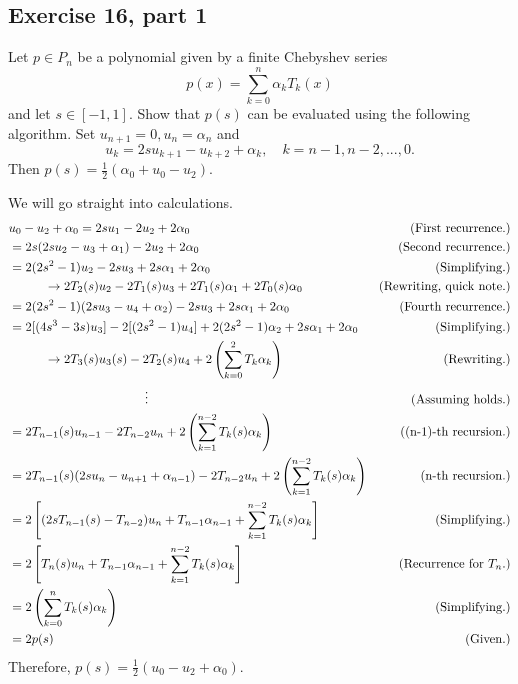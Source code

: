\subsection{Exercise 16, part 1}
Let $p \in P_n$ be a polynomial given by a finite Chebyshev series
\[p(x) = \sum_{k = 0}^n \alpha_k T_k(x)\]
and let $s \in [-1, 1]$. Show that $p(s)$ can be evaluated using the following algorithm. Set $u_{n+1} = 0, u_n = \alpha_n$ and 
\[u_k = 2su_{k+1} - u_{k+2} + \alpha_k, \quad k = n - 1, n - 2, ..., 0.\]
Then $p(s) = \frac{1}{2}(\alpha_0 + u_0 - u_2).$
\partbreak
\begin{solution}

    We will go straight into calculations. 
    \tightalignbreak
\begin{align*}
    &u_0 - u_2 + \alpha_0 = 2su_1 - 2u_2 + 2\alpha_0 &\text{(First recurrence.)}\\
    &= 2s(2su_2 - u_3 + \alpha_1) - 2u_2 + 2\alpha_0 &\text{(Second recurrence.)}\\
    &= 2(2s^2 - 1)u_2 - 2su_3 + 2s\alpha_1 + 2\alpha_0 &\text{(Simplifying.)}\\
    &\hspace{10mm}\rightarrow 2T_2(s)u_2 - 2T_1(s)u_3 + 2T_1(s)\alpha_1 + 2T_0(s)\alpha_0 &\text{(Rewriting, quick note.)}\\
    &= 2(2s^2 - 1)(2su_3 - u_4 + \alpha_2) - 2su_3 + 2s\alpha_1 + 2\alpha_0&\text{(Fourth recurrence.)}\\
    &= 2[(4s^3 - 3s)u_3] - 2[(2s^2 - 1)u_4] + 2(2s^2 - 1)\alpha_2 + 2s\alpha_1 + 2\alpha_0 &\text{(Simplifying.)}\\
    &\hspace{10mm}\rightarrow 2T_3(s)u_3(s) - 2T_2(s)u_4 + 2\left(\sum_{k = 0}^2 T_k\alpha_k\right) &\text{(Rewriting.)}\\
    &\hspace{1.5in}\vdots &\text{(Assuming holds.)}\\
    &= 2T_{n-1}(s)u_{n-1} - 2T_{n-2}u_n + 2\left(\sum_{k = 1}^{n-2}T_k(s)\alpha_k\right) &\text{((n-1)-th recursion.)}\\
    &= 2T_{n-1}(s)(2su_n - u_{n+1} + \alpha_{n-1}) - 2T_{n-2}u_n + 2\left(\sum_{k = 1}^{n-2}T_k(s)\alpha_k\right) &\text{(n-th recursion.)}\\
    &= 2\left[ (2sT_{n-1}(s) - T_{n-2})u_n + T_{n-1}\alpha_{n-1} + \sum_{k = 1}^{n-2}T_k(s)\alpha_k\right] &\text{(Simplifying.)}\\
    &= 2\left[T_n(s)u_n + T_{n-1}\alpha_{n-1} + \sum_{k = 1}^{n-2}T_k(s)\alpha_k\right] &\text{(Recurrence for $T_n$.)}\\
    &= 2\left(\sum_{k = 0}^n T_k(s)\alpha_k\right)&\text{(Simplifying.)}\\
    &=2p(s) &\text{(Given.)}
\end{align*}
\vspace{-12mm}\alignbreak
Therefore, $p(s) = \frac{1}{2}(u_0 - u_2 + \alpha_0)$. 

\end{solution}


